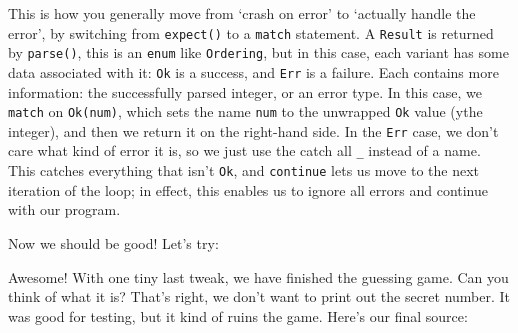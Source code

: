 \documentclass[a4paper,]{book}
\newenvironment{Shaded}{\begin{snugshade}}{\end{snugshade}}
\newcommand{\KeywordTok}[1]{\textcolor[rgb]{0.13,0.29,0.53}{\textbf{{#1}}}}
\newcommand{\NormalTok}[1]{{#1}}
\begin{document}
This is how you generally move from `crash on error' to `actually handle
the error', by switching from \texttt{expect()} to a \texttt{match}
statement. A \texttt{Result} is returned by \texttt{parse()}, this is an
\texttt{enum} like \texttt{Ordering}, but in this case, each variant has
some data associated with it: \texttt{Ok} is a success, and \texttt{Err}
is a failure. Each contains more information: the successfully parsed
integer, or an error type. In this case, we \texttt{match} on
\texttt{Ok(num)}, which sets the name \texttt{num} to the unwrapped
\texttt{Ok} value (ythe integer), and then we return it on the
right-hand side. In the \texttt{Err} case, we don't care what kind of
error it is, so we just use the catch all \texttt{\_} instead of a name.
This catches everything that isn't \texttt{Ok}, and \texttt{continue}
lets us move to the next iteration of the loop; in effect, this enables
us to ignore all errors and continue with our program.

Now we should be good! Let's try:

\begin{Shaded}
\end{Shaded}

Awesome! With one tiny last tweak, we have finished the guessing game.
Can you think of what it is? That's right, we don't want to print out
the secret number. It was good for testing, but it kind of ruins the
game. Here's our final source:
\end{document}
